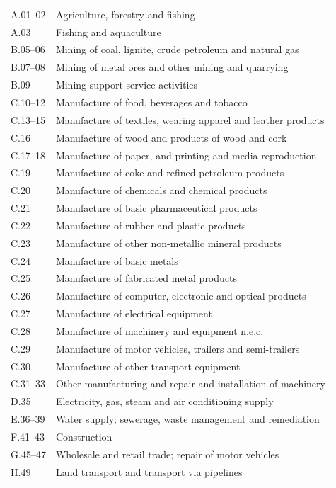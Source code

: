 \begin{longtable}{ll}
A.01--02 & Agriculture, forestry and fishing \\
A.03 & Fishing and aquaculture \\
B.05--06 & Mining of coal, lignite, crude petroleum and natural gas \\
B.07--08 & Mining of metal ores and other mining and quarrying \\
B.09 & Mining support service activities \\
C.10--12 & Manufacture of food, beverages and tobacco \\
C.13--15 & Manufacture of textiles, wearing apparel and leather products \\
C.16 & Manufacture of wood and products of wood and cork \\
C.17--18 & Manufacture of paper, and printing and media reproduction \\
C.19 & Manufacture of coke and refined petroleum products \\
C.20 & Manufacture of chemicals and chemical products \\
C.21 & Manufacture of basic pharmaceutical products \\
C.22 & Manufacture of rubber and plastic products \\
C.23 & Manufacture of other non-metallic mineral products \\
C.24 & Manufacture of basic metals \\
C.25 & Manufacture of fabricated metal products \\
C.26 & Manufacture of computer, electronic and optical products \\
C.27 & Manufacture of electrical equipment \\
C.28 & Manufacture of machinery and equipment n.e.c. \\
C.29 & Manufacture of motor vehicles, trailers and semi-trailers \\
C.30 & Manufacture of other transport equipment \\
C.31--33 & Other manufacturing and repair and installation of machinery \\
D.35 & Electricity, gas, steam and air conditioning supply \\
E.36--39 & Water supply; sewerage, waste management and remediation \\
F.41--43 & Construction \\
G.45--47 & Wholesale and retail trade; repair of motor vehicles \\
H.49 & Land transport and transport via pipelines \\

\end{longtable}
